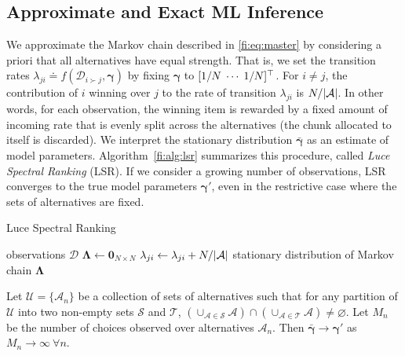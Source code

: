 \subsection{Approximate and Exact ML Inference}

We approximate the Markov chain described in \eqref{fi:eq:master} by considering a priori that all alternatives have equal strength.
That is, we set the transition rates $\lambda_{ji} \doteq f(\mathcal{D}_{i \succ j}, \bm{\gamma})$ by fixing $\bm{\gamma}$ to $[1/N \; \cdots \; 1/N]^\top$.
For $i \ne j$, the contribution of $i$ winning over $j$ to the rate of transition $\lambda_{ji}$ is $N / \lvert \mathcal{A} \rvert$.
In other words, for each observation, the winning item is rewarded by a fixed amount of incoming rate that is evenly split across the alternatives (the chunk allocated to itself is discarded).
We interpret the stationary distribution $\bar{\bm{\gamma}}$ as an estimate of model parameters.
Algorithm~\ref{fi:alg:lsr} summarizes this procedure, called \emph{Luce Spectral Ranking} (LSR).
If we consider a growing number of observations, LSR converges to the true model parameters $\bm{\gamma}'$, even in the restrictive case where the sets of alternatives are fixed.

\begin{algorithm}[ht]
  \caption{Luce Spectral Ranking}
  \label{fi:alg:lsr}
  \begin{algorithmic}[1]
    \Require observations $\mathcal{D}$
    \State $\bm{\Lambda} \gets \bm{0}_{N \times N}$
        \State $\lambda_{ji} \gets \lambda_{ji} + N / \lvert \mathcal{A} \rvert$
      \EndFor
    \EndFor
    \State \Return stationary distribution of Markov chain $\bm{\Lambda}$
  \end{algorithmic}
\end{algorithm}

\begin{theorem}
\label{fi:thm:consistency}
Let $\mathcal{U} = \{ \mathcal{A}_n \}$ be a collection of sets of alternatives such that for any partition of $\mathcal{U}$ into two non-empty sets $\mathcal{S}$ and $\mathcal{T}$, $\left( \cup_{\mathcal{A} \in \mathcal{S}} \mathcal{A} \right) \cap \left( \cup_{\mathcal{A} \in \mathcal{T}} \mathcal{A} \right) \ne \varnothing$.
Let $M_n$ be the number of choices observed over alternatives $\mathcal{A}_n$.
Then $\bar{\bm{\gamma}} \to \bm{\gamma}'$ as $M_n \to \infty \ \forall n$.
\end{theorem}

